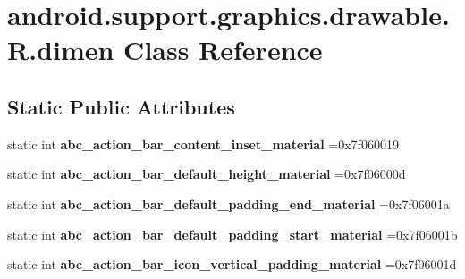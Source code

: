 \hypertarget{classandroid_1_1support_1_1graphics_1_1drawable_1_1R_1_1dimen}{}\section{android.\+support.\+graphics.\+drawable.\+R.\+dimen Class Reference}
\label{classandroid_1_1support_1_1graphics_1_1drawable_1_1R_1_1dimen}
\subsection*{Static Public Attributes}
\begin{DoxyCompactItemize}
\item 
\mbox{\label{classandroid_1_1support_1_1graphics_1_1drawable_1_1R_1_1dimen_a739e9fa21358dd9f495d2bb3abe72d4a}} 
static int {\bfseries abc\+\_\+action\+\_\+bar\+\_\+content\+\_\+inset\+\_\+material} =0x7f060019
\item 
\mbox{\label{classandroid_1_1support_1_1graphics_1_1drawable_1_1R_1_1dimen_acfabdbee17bb88939b31eff0f01d0d53}} 
static int {\bfseries abc\+\_\+action\+\_\+bar\+\_\+default\+\_\+height\+\_\+material} =0x7f06000d
\item 
\mbox{\label{classandroid_1_1support_1_1graphics_1_1drawable_1_1R_1_1dimen_a49d5506480f965aa679b3f375aab4b09}} 
static int {\bfseries abc\+\_\+action\+\_\+bar\+\_\+default\+\_\+padding\+\_\+end\+\_\+material} =0x7f06001a
\item 
\mbox{\label{classandroid_1_1support_1_1graphics_1_1drawable_1_1R_1_1dimen_ae04467949e882bc8927001dc49456788}} 
static int {\bfseries abc\+\_\+action\+\_\+bar\+\_\+default\+\_\+padding\+\_\+start\+\_\+material} =0x7f06001b
\item 
\mbox{\label{classandroid_1_1support_1_1graphics_1_1drawable_1_1R_1_1dimen_abc7ddb465f20fffcf80a5386ad62e59a}} 
static int {\bfseries abc\+\_\+action\+\_\+bar\+\_\+icon\+\_\+vertical\+\_\+padding\+\_\+material} =0x7f06001d

\end{DoxyCompactItemize}
